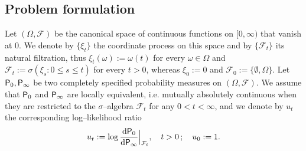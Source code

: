 \documentclass[11pt,reqno]{amsart}
\theoremstyle{remark}
\begin{document}
\subsection{Problem formulation}
Let $(\Omega, {\mathcal{F}})$ be the canonical space of continuous functions on $[0, \infty)$ that vanish at 0. 
We denote by $\{\xi_{t}\}$ the coordinate process on this space and  by $\{{\mathcal{F}_{t}}\}$ its natural filtration, thus 
$\xi_{t}(\omega):=\omega(t)$ for every $\omega \in \Omega$ and ${\mathcal{F}_{t}}:=\sigma(\xi_{s}: 0 \leq s \leq t)$ for every $t>0$, whereas 
$\xi_{0}:=0$ and ${\mathcal{F}}_{0}:=\{\emptyset, \Omega\}$. Let ${{\sf P}}_{0}, {{\sf P}}_{\infty}$ be two completely specified probability measures on $(\Omega, {\mathcal{F}})$. We assume that ${{\sf P}}_{0}$ and ${{\sf P}}_{\infty}$ are locally equivalent, i.e. mutually absolutely continuous when they are restricted to the $\sigma$--algebra ${\mathcal{F}_{t}}$ for any  $0 < t< \infty$,  and we denote by $u_{t}$ the corresponding log--likelihood ratio 
\begin{equation*} 
u_{t} := \log \frac{\text{d}{{\sf P}}_{0}}{\text{d}{{\sf P}}_{\infty}} \Big|_{\mathcal{F}_{t}}, \quad t>0 \, ; \quad u_{0}:=1.
\end{equation*}
\end{document}
